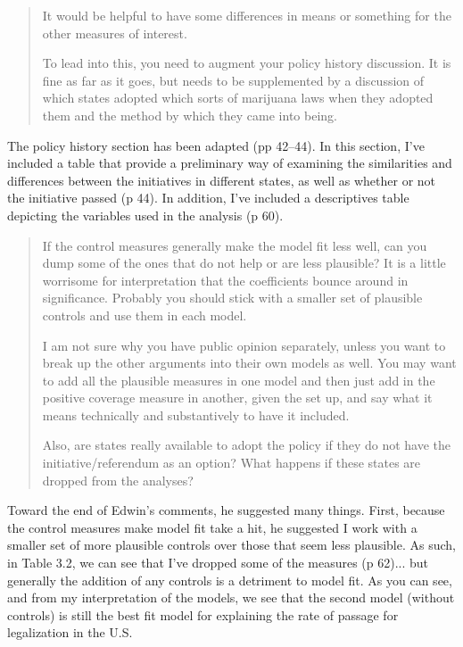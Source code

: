 \documentclass[12pt,stdletter,dateno,sigleft]{newlfm} %
\begin{document}
\begin{newlfm}
\begin{quotation}
{\noindent It would be helpful to have some differences in means or something for the other measures of interest. \newline

\noindent To lead into this, you need to augment your policy history discussion.  It is fine as far as it goes, but needs to be supplemented by a discussion of which states adopted which sorts of marijuana laws when they adopted them and the method by which they came into being.
}
\end{quotation}



The policy history section has been adapted (pp 42--44). In this section, I've included a table that provide a preliminary way of examining the similarities and differences between the initiatives in different states, as well as whether or not the initiative passed (p 44). In addition, I've included a descriptives table depicting the variables used in the analysis (p 60).

\begin{quotation}{\color{red}\noindent \footnotesize
If the control measures generally make the model fit less well, can you dump some of the ones that do not help or are less plausible?  It is a little worrisome for interpretation that the coefficients bounce around in significance.  Probably you should stick with a smaller set of plausible controls and use them in each model.\newline

\noindent I am not sure why you have public opinion separately, unless you want to break up the other arguments into their own models as well.  You may want to add all the plausible measures in one model and then just add in the positive coverage measure in another, given the set up, and say what it means technically and substantively to have it included.\newline

\noindent Also, are states really available to adopt the policy if they do not have the initiative/referendum as an option? What happens if these states are dropped from the analyses? 
}
\end{quotation}



Toward the end of Edwin's comments, he suggested many things. First, because the control measures make model fit take a hit, he suggested I work with a smaller set of more plausible controls over those that seem less plausible. As such, in Table 3.2, we can see that I've dropped some of the measures (p 62)... but generally the addition of any controls is a detriment to model fit. As you can see, and from my interpretation of the models, we see that the second model (without controls) is still the best fit model for explaining the rate of passage for legalization in the U.S.


\end{newlfm}
\end{document}
